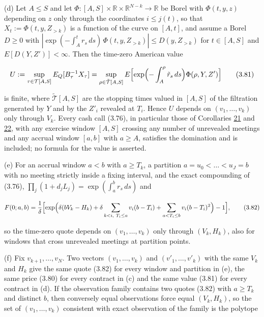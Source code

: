 \documentclass[11pt]{article}
\begin{document}
(d) Let \(A \le S\) and let \(\Phi : [A, S] \times \mathbb R \times \mathbb R^{N-k} \to \mathbb R\) be Borel with \(\Phi(t, y, z)\) depending on \(z\) only through the coordinates \(i \le j(t)\), so that \(X_t := \Phi(t, y, Z_{>k})\) is a function of the curve on \([A, t]\), and assume a Borel \(D \ge 0\) with \(|\exp(-\int_A^t r_s\,ds)\, \Phi(t, y, Z_{>k})| \le D(y, Z_{>k})\) for \(t \in [A, S]\) and \(E[D(Y, Z')] < \infty\). Then the time-zero American value

\begin{equation*}
U := \sup_{\tau \in \mathcal T[A, S]} E_Q[B_\tau^{-1} X_\tau] = \sup_{\rho \in \tilde{\mathcal T}[A, S]} E\Bigl[ \exp\Bigl( -\int_A^\rho \tilde r_s\,ds \Bigr) \Phi(\rho, Y, Z') \Bigr] \tag{3.81}\label{eq:3.81}
\end{equation*}

is finite, where \(\tilde{\mathcal T}[A, S]\) are the stopping times valued in \([A, S]\) of the filtration generated by \(Y\) and by the \(Z'_i\) revealed at \(T_i\). Hence \(U\) depends on \((v_1, \dots, v_k)\) only through \(V_k\). Every cash call (3.76), in particular those of Corollaries \hyperref[res:Corollary-21]{21} and \hyperref[res:Corollary-22]{22}, with any exercise window \([A, S]\) crossing any number of unrevealed meetings and any accrual window \([a, b]\) with \(a \ge A\), satisfies the domination and is included; no formula for the value is asserted.

(e) For an accrual window \(a < b\) with \(a \ge T_k\), a partition \(a = u_0 < \dots < u_J = b\) with no meeting strictly inside a fixing interval, and the exact compounding of (3.76), \(\prod_j (1 + d_j L_j) = \exp(\int_a^b r_s\,ds)\) and

\begin{equation*}
F(0; a, b) = \frac{1}{\delta} \Bigl[ \exp\Bigl( \delta (b V_k - H_k) + \delta \sum_{k < i,\ T_i \le a} v_i (b - T_i) + \sum_{a < T_i \le b} v_i (b - T_i)^2 \Bigr) - 1 \Bigr], \tag{3.82}\label{eq:3.82}
\end{equation*}

so the time-zero quote depends on \((v_1, \dots, v_k)\) only through \((V_k, H_k)\), also for windows that cross unrevealed meetings at partition points.

(f) Fix \(v_{k+1}, \dots, v_N\). Two vectors \((v_1, \dots, v_k)\) and \((v'_1, \dots, v'_k)\) with the same \(V_k\) and \(H_k\) give the same quote (3.82) for every window and partition in (e), the same price (3.80) for every contract in (c) and the same value (3.81) for every contract in (d). If the observation family contains two quotes (3.82) with \(a \ge T_k\) and distinct \(b\), then conversely equal observations force equal \((V_k, H_k)\), so the set of \((v_1, \dots, v_k)\) consistent with exact observation of the family is the polytope
\end{document}
